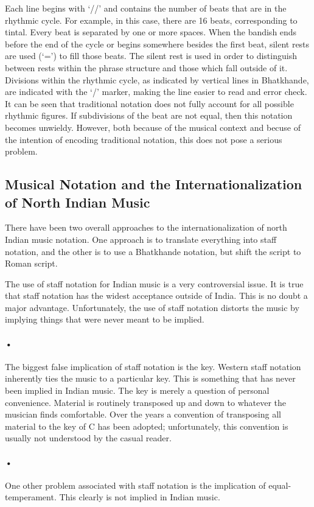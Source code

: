\documentclass[12pt,a4paper]{article}
\begin{document}
Each line begins with ‘//’ and contains the number of beats that are in the rhythmic cycle. For example, in this case, there are 16 beats, corresponding to tintal. Every beat is separated by one or more spaces. When the bandish ends before the end of the cycle or begins somewhere besides the first beat, silent rests are used (‘=’) to fill those beats. The silent rest is used in order to distinguish between rests within the phrase structure and those which fall outside of it. Divisions within the rhythmic cycle, as indicated by vertical lines in Bhatkhande, are indicated with the ‘/’ marker, making the line easier to read and error check. It can be seen that traditional notation does not fully account for all possible rhythmic figures. If subdivisions of the beat are not equal, then this notation becomes unwieldy. However, both because of the musical context and becuse of the intention of encoding traditional notation, this does not pose a serious problem.
\subsection{Musical Notation and the Internationalization of North Indian Music}


There have been two overall approaches to the internationalization of north Indian music notation.  One approach is to translate everything into staff notation, and the other is to use a Bhatkhande notation, but shift the script to Roman script.

The use of staff notation for Indian music is a very controversial issue.  It is true that staff notation has the widest acceptance outside of India.  This is no doubt a major advantage.  Unfortunately, the use of staff notation distorts the music by implying things that were never meant to be implied.
\paragraph{•}
The biggest false implication of staff notation is the key.  Western staff notation inherently ties the music to a particular key.  This is something that has never been implied in Indian music.  The key is merely a question of personal convenience.  Material is routinely transposed up and down to whatever the musician finds comfortable.  Over the years a convention of transposing all material to the key of C has been adopted; unfortunately, this convention is usually not understood by the casual reader.
\paragraph{•}
One other problem associated with staff notation is the implication of equal-temperament.  This clearly is not implied in Indian music.
\end{document}
